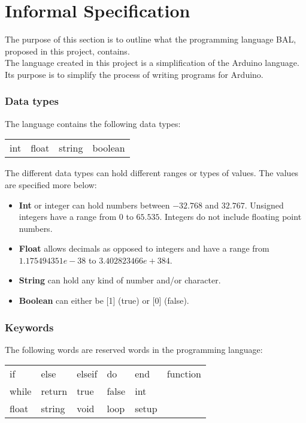 \chapter{Informal Specification}\label{analysis:informal-specification}
The purpose of this section is to outline what the programming language BAL, proposed in this project, contains.
\\The language created in this project is a simplification of the Arduino language. Its purpose is to simplify the process of writing programs for Arduino.   

\subsection{Data types}
The language contains the following data types: \\ 
\begin{center}
\begin{tabular}{ l l l l}
int & float & string & boolean \\
\end{tabular}
\end{center}

The different data types can hold different ranges or types of values. The values are specified more below: 
\begin{itemize}
\item \textbf{Int} or integer can hold numbers between $-32.768$ and $32.767$. Unsigned integers have a range from $0$ to $65.535$. Integers do not include floating point numbers.
\item \textbf{Float} allows decimals as opposed to integers and have a range from $1.175494351e-38$ to $3.402823466e+384$.
\item \textbf{String} can hold any kind of number and/or character. 
\item \textbf{Boolean} can either be [1] (true) or [0] (false). 
\end{itemize}

\subsection{Keywords}
The following words are reserved words in the programming language:\\ 
\begin{center}
\begin{tabular}{ l l l l l l}
if & else & elseif & do & end & function \\
while & return & true & false & int \\
float & string & void & loop & setup \\
\end{tabular}
\end{center}

